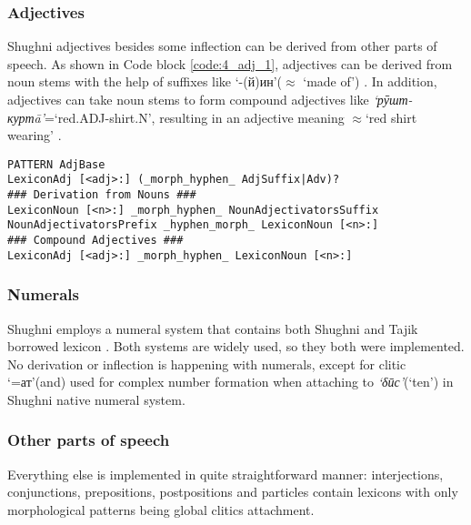 \subsubsection*{Adjectives}
Shughni adjectives besides some inflection can be derived from other parts of speech. As shown in Code block \ref{code:4_adj_1}, adjectives can be derived from noun stems with the help of suffixes like `-(й)ин'($\approx$ `made of') \parencite[169]{parker_shughni_2023}. In addition, adjectives can take noun stems to form compound adjectives like \textit{`рӯшт-куртā'}=`red.ADJ-shirt.N', resulting in an adjective meaning $\approx$`red shirt wearing' \parencite[173]{parker_shughni_2023}.

\begin{code_frame}[float,floatplacement=!h]
    \begin{footnotesize}\codespacing
    \begin{verbatim}
PATTERN AdjBase
LexiconAdj [<adj>:] (_morph_hyphen_ AdjSuffix|Adv)?
### Derivation from Nouns ###
LexiconNoun [<n>:] _morph_hyphen_ NounAdjectivatorsSuffix
NounAdjectivatorsPrefix _hyphen_morph_ LexiconNoun [<n>:]
### Compound Adjectives ###
LexiconAdj [<adj>:] _morph_hyphen_ LexiconNoun [<n>:]        
    \end{verbatim}
    \end{footnotesize}
    \tcblower
    \label{code:4_adj_1}
\end{code_frame}

\subsubsection*{Numerals}
Shughni employs a numeral system that contains both Shughni and Tajik borrowed lexicon \parencite[176]{parker_shughni_2023}. Both systems are widely used, so they both were implemented. No derivation or inflection is happening with numerals, except for clitic `=ат'(and) used for complex number formation when attaching to \textit{`δӣс'}(`ten') in Shughni native numeral system.

\subsubsection*{Other parts of speech}
Everything else is implemented in quite straightforward manner: interjections, conjunctions, prepositions, postpositions and particles contain lexicons with only morphological patterns being global clitics attachment. 

\FloatBarrier

